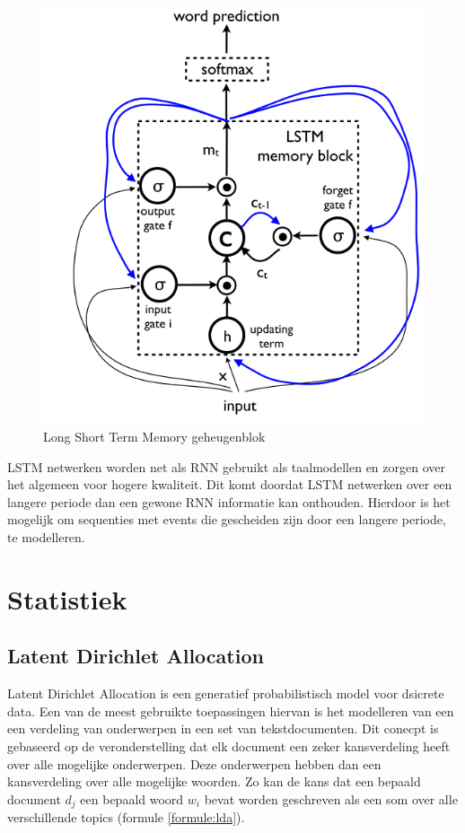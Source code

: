 \begin{figure}[tb]
    \centering
    \includegraphics[width=\linewidth]{Images/lstm.PNG}
    \caption{Long Short Term Memory geheugenblok}
    \label{fig:lstm}
\end{figure}

LSTM netwerken worden net als RNN gebruikt als taalmodellen en zorgen over het algemeen voor hogere kwaliteit. Dit komt doordat LSTM netwerken over een langere periode dan een gewone RNN informatie kan onthouden. Hierdoor is het mogelijk om sequenties met events die gescheiden zijn door een langere periode, te modelleren. 

\section{Statistiek}

\subsection{Latent Dirichlet Allocation}
Latent Dirichlet Allocation is een generatief probabilistisch model voor dsicrete data. Een van de meest gebruikte toepassingen hiervan is het modelleren van een een verdeling van onderwerpen in een set van tekstdocumenten. Dit conecpt is gebaseerd op de veronderstelling dat elk document een zeker kansverdeling heeft over alle mogelijke onderwerpen. Deze onderwerpen hebben dan een kansverdeling over alle mogelijke woorden. Zo kan de kans dat een bepaald document $d_j$ een bepaald woord $w_i$ bevat worden geschreven als een som over alle verschillende topics (formule \ref{formule:lda}). 

